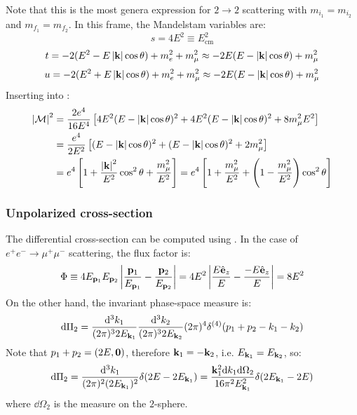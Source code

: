 Note that this is the most genera expression for $ 2 \rightarrow 2 $ scattering with $ m_{i_1} = m_{i_2} $ and $ m_{f_1} = m_{f_2} $. In this frame, the Mandelstam variables are:
\begin{equation*}
  s = 4E^2 \equiv E_\text{cm}^2
\end{equation*}
\begin{equation*}
  t = -2 (E^2 - E \left\lvert\mathbf{k}\right\rvert \cos \theta) + m_e^2 + m_\mu^2 \approx -2E (E - \left\lvert\mathbf{k}\right\rvert \cos \theta) + m_\mu^2
\end{equation*}
\begin{equation*}
  u = -2 (E^2 + E \left\lvert\mathbf{k}\right\rvert \cos \theta) + m_e^2 + m_\mu^2 \approx -2E (E - \left\lvert\mathbf{k}\right\rvert \cos \theta) + m_\mu^2
\end{equation*}
Inserting into :
\begin{equation*}
  \begin{split}
    \left\lvert\mathcal{M}\right\rvert^2
    & = \frac{2e^4}{16 E^4} \left[ 4E^2 (E - \left\lvert\mathbf{k}\right\rvert \cos \theta)^2 + 4E^2 (E - \left\lvert\mathbf{k}\right\rvert \cos \theta)^2 + 8 m_\mu^2 E^2 \right] \\
    & = \frac{e^4}{2E^2} \left[ (E - \left\lvert\mathbf{k}\right\rvert \cos \theta)^2 + (E - \left\lvert\mathbf{k}\right\rvert \cos \theta)^2 + 2m_\mu^2 \right] \\
    & = e^4 \left[ 1 + \frac{\left\lvert\mathbf{k}\right\rvert^2}{E^2} \cos^2 \theta + \frac{m_\mu^2}{E^2} \right] = e^4 \left[ 1 + \frac{m_\mu^2}{E^2} + \left( 1 - \frac{m_\mu^2}{E^2} \right) \cos^2 \theta \right]
  \end{split}
\end{equation*}

\subsubsection{Unpolarized cross-section}

The differential cross-section can be computed using . In the case of $ e^+ e^- \rightarrow \mu^+ \mu^- $ scattering, the flux factor is:
\begin{equation*}
  \Phi \equiv 4 E_{\mathbf{p}_1} E_{\mathbf{p}_2} \left\lvert\frac{\mathbf{p}_1}{E_{\mathbf{p}_1}} - \frac{\mathbf{p}_2}{E_{\mathbf{p}_2}}\right\rvert = 4E^2 \left\lvert\frac{E \hat{\mathbf{e}}_z}{E} - \frac{-E \hat{\mathbf{e}}_z}{E}\right\rvert = 8E^2
\end{equation*}
On the other hand, the invariant phase-space measure is:
\begin{equation*}
  \mathrm{d} \Pi_2 = \frac{\mathrm{d}^3k_1}{(2\pi)^3 2E_{\mathbf{k}_1}} \frac{\mathrm{d}^3k_2}{(2\pi)^3 2E_{\mathbf{k}_2}} (2\pi)^4 \delta^{(4)}(p_1 + p_2 - k_1 - k_2)
\end{equation*}
Note that $ p_1 + p_2 = (2E, \mathbf{0}) $, therefore $ \mathbf{k}_1 = - \mathbf{k}_2 $, i.e. $ E_{\mathbf{k}_1} = E_{\mathbf{k}_2} $, so:
\begin{equation*}
    \mathrm{d} \Pi_2 = \frac{\mathrm{d}^3k_1}{(2\pi)^2 (2E_{\mathbf{k}_1})^2} \delta(2E - 2E_{\mathbf{k}_1}) = \frac{\mathbf{k}_1^2 \mathrm{d} k_1 \mathrm{d} \Omega_2}{16 \pi^2 E_{\mathbf{k}_1}^2} \delta(2E_{\mathbf{k}_1} - 2E)
\end{equation*}
where $ \dd \Omega_2 $ is the measure on the $ 2 $-sphere\footnotemark.


